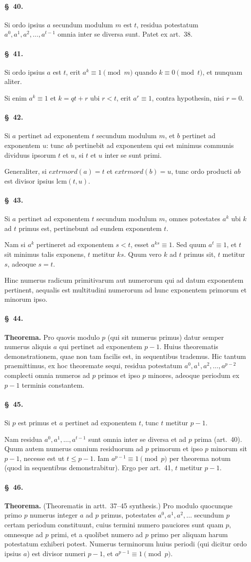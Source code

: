 \documentclass[12pt,a4paper]{article}
\theoremstyle{plain}
\theoremstyle{definition}
\theoremstyle{remark}
\newcommand{\art}[1]{\paragraph{\S\ #1.}}
\begin{document}
\art{40}
Si ordo ipsius $a$ secundum modulum $m$ est $t$, residua potestatum $a^0, a^1, a^2, \ldots, a^{t-1}$ omnia inter se diversa sunt. Patet ex art.~38.

\art{41}
Si ordo ipsius $a$ est $t$, erit $a^k \equiv 1 \pmod{m}$ quando $k \equiv 0 \pmod{t}$, et nunquam aliter.

Si enim $a^k \equiv 1$ et $k = qt + r$ ubi $r < t$, erit $a^r \equiv 1$, contra hypothesin, nisi $r = 0$.

\art{42}
Si $a$ pertinet ad exponentem $t$ secundum modulum $m$, et $b$ pertinet ad exponentem $u$: tunc $ab$ pertinebit ad exponentem qui est minimus communis dividuus ipsorum $t$ et $u$, si $t$ et $u$ inter se sunt primi.

Generaliter, si $	extrm{ord}(a) = t$ et $	extrm{ord}(b) = u$, tunc ordo producti $ab$ est divisor ipsius $\textrm{lcm}(t, u)$.

\art{43}
Si $a$ pertinet ad exponentem $t$ secundum modulum $m$, omnes potestates $a^k$ ubi $k$ ad $t$ primus est, pertinebunt ad eundem exponentem $t$.

Nam si $a^{k}$ pertineret ad exponentem $s < t$, esset $a^{ks} \equiv 1$. Sed quum $a^t \equiv 1$, et $t$ sit minimus talis exponens, $t$ metitur $ks$. Quum vero $k$ ad $t$ primus sit, $t$ metitur $s$, adeoque $s = t$.

Hinc numerus radicum primitivarum aut numerorum qui ad datum exponentem pertinent, aequalis est multitudini numerorum ad hunc exponentem primorum et minorum ipso.

\art{44}
\textbf{Theorema.} Pro quovis modulo $p$ (qui sit numerus primus) datur semper numerus aliquis $a$ qui pertinet ad exponentem $p-1$. Huius theorematis demonstrationem, quae non tam facilis est, in sequentibus trademus. Hic tantum praemittimus, ex hoc theoremate sequi, residua potestatum $a^0, a^1, a^2, \ldots, a^{p-2}$ complecti omnia numeros ad $p$ primos et ipso $p$ minores, adeoque periodum ex $p-1$ terminis constantem.

\art{45}
Si $p$ est primus et $a$ pertinet ad exponentem $t$, tunc $t$ metitur $p-1$.

Nam residua $a^0, a^1, \ldots, a^{t-1}$ sunt omnia inter se diversa et ad $p$ prima (art.~40). Quum autem numerus omnium residuorum ad $p$ primorum et ipso $p$ minorum sit $p-1$, necesse est ut $t \leq p-1$. Iam $a^{p-1} \equiv 1 \pmod{p}$ per theorema notum (quod in sequentibus demonstrabitur). Ergo per art.~41, $t$ metitur $p-1$.

\art{46}
\textbf{Theorema.} (Theorematis in artt.~37--45 synthesis.) Pro modulo quocunque primo $p$ numerus integer $a$ ad $p$ primus, potestates $a^0, a^1, a^2, \ldots$ secundum $p$ certam periodum constituunt, cuius termini numero pauciores sunt quam $p$, omnesque ad $p$ primi, et a quolibet numero ad $p$ primo per aliquam harum potestatum exhiberi potest. Numerus terminorum huius periodi (qui dicitur ordo ipsius $a$) est divisor numeri $p-1$, et $a^{p-1} \equiv 1 \pmod{p}$.
\end{document}
